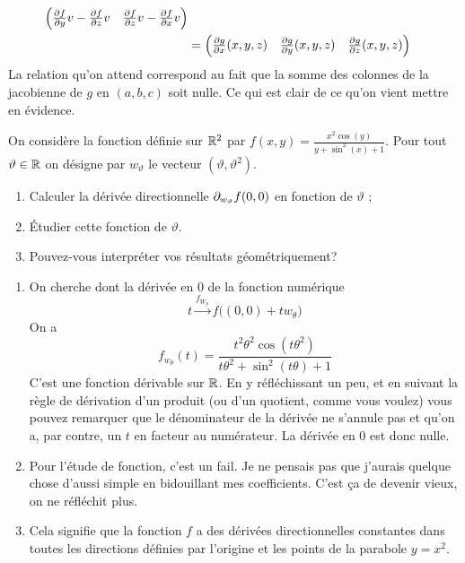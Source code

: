 \documentclass[11pt, a4paper]{article}
\begin{document}
\begin{solution}
\begin{align}
\begin{pmatrix}
                              \frac{\partial f}{\partial y}v
                              - \frac{\partial f}{\partial z}v &
                              \frac{\partial f}{\partial z}v
                              -\frac{\partial f}{\partial x}v
                            \end{pmatrix}\\
                          & = 
                            \begin{pmatrix}
                              \frac{\partial g}{\partial x}(x, y, z) & 
                              \frac{\partial g}{\partial y}(x, y, z) & 
                              \frac{\partial g}{\partial z}(x, y, z) 
                            \end{pmatrix}
  \end{align}
  La relation qu'on attend correspond au fait que la somme des
  colonnes de la jacobienne de $g$ en $(a, b, c)$ soit nulle. Ce qui
  est clair de ce qu'on vient mettre en évidence.
\end{solution}

\begin{question}
  On considère la fonction définie sur $\mathbb{R}^2$ par
  $f(x, y) = \frac{x^2\cos(y)}{y + \sin^2(x) + 1}$. Pour tout
  $\vartheta \in \mathbb{R}$ on désigne par $w_\vartheta$ le vecteur
  $(\vartheta, \vartheta^2)$. 
  \begin{enumerate}
  \item Calculer la dérivée directionnelle $\partial_{w_\vartheta}f(0, 0)$
    en fonction de $\vartheta$ ;
  \item Étudier cette fonction de $\vartheta$.
  \item Pouvez-vous interpréter vos résultats géométriquement?
  \end{enumerate}
\end{question}
\begin{solution}
  \begin{enumerate}
  \item
    On cherche dont la dérivée en $0$ de la fonction numérique 
    \[
    t \xrightarrow{f_{W_\theta}} f\big((0,0) + tw_\theta\big) 
    \]
    On a
    \[
    f_{w_\theta}(t) = \dfrac{t^2\theta^2\cos(t\theta^2)}{t\theta^2 + \sin^2(t\theta) + 1}
    \]
    C'est une fonction dérivable sur $\mathbb{R}$. En y réfléchissant un peu, et
    en suivant la règle de dérivation d'un produit (ou d'un quotient,
    comme vous voulez) vous pouvez remarquer que le dénominateur de la
    dérivée ne s'annule pas et qu'on a, par contre, un $t$ en facteur au
    numérateur. La dérivée en $0$ est donc nulle. 
  \item 
    Pour l'étude de fonction, c'est un fail. Je ne pensais pas que
    j'aurais quelque chose d'aussi simple en bidouillant mes
    coefficients. C'est \c{c}a de devenir vieux, on ne réfléchit plus.
  \item 
    Cela signifie que la fonction $f$ a des dérivées directionnelles
    constantes dans toutes les directions définies par l'origine et
    les points de la parabole $y = x^2$.
  \end{enumerate}
\end{solution}
\end{document}
